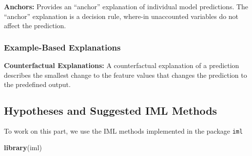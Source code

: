 \documentclass[
]{article}
\newenvironment{Shaded}{\begin{snugshade}}{\end{snugshade}}
\newcommand{\KeywordTok}[1]{\textcolor[rgb]{0.13,0.29,0.53}{\textbf{#1}}}
\newcommand{\NormalTok}[1]{#1}
\begin{document}
\textbf{Anchors:} Provides an ``anchor'' explanation of individual model predictions. The ``anchor'' explanation is a decision rule, where-in unaccounted variables do not affect the prediction.

\hypertarget{example-based-explanations}{%
\subsubsection{Example-Based Explanations}\label{example-based-explanations}}

\textbf{Counterfactual Explanations:} A counterfactual explanation of a prediction describes the smallest change to the feature values that changes the prediction to the predefined output.

\hypertarget{hypotheses-and-suggested-iml-methods}{%
\subsection{Hypotheses and Suggested IML Methods}\label{hypotheses-and-suggested-iml-methods}}

To work on this part, we use the IML methods implemented in the package \texttt{iml}

\begin{Shaded}
\begin{Highlighting}[]
\KeywordTok{library}\NormalTok{(iml)}
\end{Highlighting}
\end{Shaded}
\end{document}
